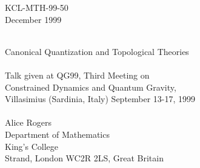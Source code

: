 \documentclass[a4paper,fleqn,12pt]{article}
\providecommand{\BRST}{{\small BRST}}
\begin{document}
  \begin{flushright}
 KCL-MTH-99-50\\
 December 1999\\
 \
  \end{flushright}

  \begin{center}{\huge Canonical Quantization and Topological Theories}\\
 \ \\
 {\large Talk given at QG99,
 Third Meeting on\\
 Constrained Dynamics and Quantum Gravity,\\
 Villasimius (Sardinia, Italy) September 13-17, 1999\\
 \ \\
%
 Alice Rogers\\
 Department of Mathematics\\
 King's College}\\
 Strand, London WC2R 2LS, Great Britain\\
  \end{center}
 \begin{abstract}
The canonical quantization of the topological particle is
described; it is shown that \BRST\ quantization of the model gives
the supersymmetric quantum mechanical model considered by Witten
when investigating Morse theory, and the rigorous path integral
method appropriate for this model is discussed. Possibilities for
the extension of this work to two dimensional models are briefly
considered.
 \end{abstract}
%
\end{document}
